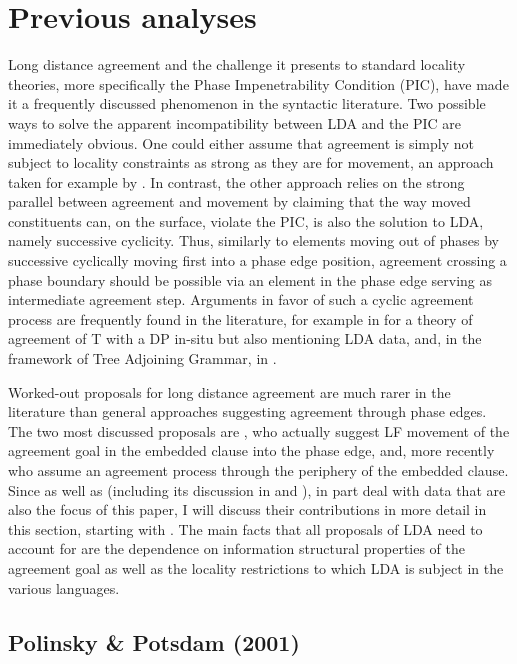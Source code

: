 \documentclass[output=paper
,modfonts
,nonflat]{langsci/langscibook}
\begin{document}
\section{Previous analyses}
\label{ch:3}

Long distance agreement and the challenge it presents to standard locality theories, more specifically the Phase Impenetrability Condition (PIC), have made it a frequently discussed phenomenon in the syntactic literature. Two possible ways to solve the apparent incompatibility between LDA and the PIC are immediately obvious. One could either assume that agreement is simply not subject to locality constraints as strong as they are for movement, an approach taken for example by \citet{Boskovic2007}. In contrast, the other approach relies on the strong parallel between agreement and movement by claiming that the way moved constituents can, on the surface, violate the PIC, is also the solution to LDA, namely successive cyclicity. Thus, similarly to elements moving out of phases by successive cyclically moving first into a phase edge position, agreement crossing a phase boundary should be possible via an element in the phase edge serving as intermediate agreement step. Arguments in favor of such a cyclic agreement process are frequently found in the literature, for example in \citet{Legate2005} for a theory of agreement of T with a DP in-situ but also mentioning LDA data, and, in the framework of Tree Adjoining Grammar, in \citet{Frank2006}. 

Worked-out proposals for long distance agreement are much rarer in the literature than general approaches suggesting agreement through phase edges. The two most discussed proposals are \citet{Polinsky_Potsdam2001}, who actually suggest LF movement of the agreement goal in the embedded clause into the phase edge, and, more recently \citet{Bjorkman_Zeijlstra2014} who assume an agreement process through the periphery of the embedded clause. Since \citet{Polinsky_Potsdam2001} as well as \citet{Bjorkman_Zeijlstra2014} (including its discussion in \citealt{Preminger2013} and \citealt{Preminger_Polinsky2015}), in part deal with data that are also the focus of this paper, I will discuss their contributions in more detail in this section, starting with \citet{Polinsky_Potsdam2001}. The main facts that all proposals of LDA need to account for are the dependence on information structural properties of the agreement goal as well as the locality restrictions to which LDA is subject in the various languages.

\subsection{Polinsky \& Potsdam (2001)}
\end{document}

